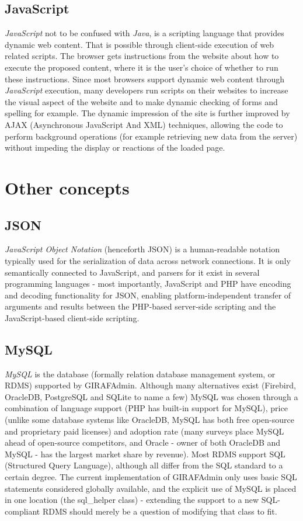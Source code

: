 \subsection{JavaScript}
\textit{JavaScript} not to be confused with \textit{Java}, is a scripting language that provides dynamic web content. That is possible through client-side execution of web related scripts. The browser gets instructions from the website about how to execute the proposed content, where it is the user's choice of whether to run these instructions.
Since most browsers support dynamic web content through \textit{JavaScript} execution, many developers run scripts on their websites to increase the visual aspect of the website and to make dynamic checking of forms and spelling for example.\cite{javascript} The dynamic impression of the site is further improved by AJAX (Asynchronous JavaScript And XML) techniques, allowing the code to perform background operations (for example retrieving new data from the server) without impeding the display or reactions of the loaded page.

\section{Other concepts}

\subsection{JSON}
\textit{JavaScript Object Notation} (henceforth JSON) is a human-readable notation typically used for the serialization of data across network connections. It is only semantically connected to JavaScript, and parsers for it exist in several programming languages - most importantly, JavaScript and PHP have encoding and decoding functionality for JSON, enabling platform-independent transfer of arguments and results between the PHP-based server-side scripting and the JavaScript-based client-side scripting.

\subsection{MySQL}
\textit{MySQL} is the database (formally relation database management system, or RDMS) supported by GIRAFAdmin. Although many alternatives exist (Firebird, OracleDB, PostgreSQL and SQLite to name a few) MySQL was chosen through a combination of language support (PHP has built-in support for MySQL), price (unlike some database systems like OracleDB, MySQL has both free open-source and proprietary paid licenses) and adoption rate (many surveys place MySQL ahead of open-source competitors, and Oracle - owner of both OracleDB and MySQL - has the largest market share by revenue). Most RDMS support SQL (Structured Query Language), although all differ from the SQL standard to a certain degree. The current implementation of GIRAFAdmin only uses basic SQL statements considered globally available, and the explicit use of MySQL is placed in one location (the sql\_helper class) - extending the support to a new SQL-compliant RDMS should merely be a question of modifying that class to fit.

